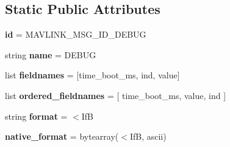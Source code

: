 \subsection*{Static Public Attributes}
\begin{DoxyCompactItemize}
\item 
\mbox{\label{classpymavlink_1_1dialects_1_1v10_1_1MAVLink__debug__message_a1e20d4c94801286ff8bda1676ebaf6cb}} 
{\bfseries id} = M\+A\+V\+L\+I\+N\+K\+\_\+\+M\+S\+G\+\_\+\+I\+D\+\_\+\+D\+E\+B\+UG
\item 
\mbox{\label{classpymavlink_1_1dialects_1_1v10_1_1MAVLink__debug__message_a5b3803ddad935b6e8ca979e3b39d24dd}} 
string {\bfseries name} = \textquotesingle{}D\+E\+B\+UG\textquotesingle{}
\item 
\mbox{\label{classpymavlink_1_1dialects_1_1v10_1_1MAVLink__debug__message_acf44ba440fdadf92e10a3fca32f04ab8}} 
list {\bfseries fieldnames} = \mbox{[}\textquotesingle{}time\+\_\+boot\+\_\+ms\textquotesingle{}, \textquotesingle{}ind\textquotesingle{}, \textquotesingle{}value\textquotesingle{}\mbox{]}
\item 
\mbox{\label{classpymavlink_1_1dialects_1_1v10_1_1MAVLink__debug__message_a47cc8a42c982e3cadd7e345e4ec17587}} 
list {\bfseries ordered\+\_\+fieldnames} = \mbox{[} \textquotesingle{}time\+\_\+boot\+\_\+ms\textquotesingle{}, \textquotesingle{}value\textquotesingle{}, \textquotesingle{}ind\textquotesingle{} \mbox{]}
\item 
\mbox{\label{classpymavlink_1_1dialects_1_1v10_1_1MAVLink__debug__message_a4773099204fbaf263d094ac1aef6093d}} 
string {\bfseries format} = \textquotesingle{}$<$IfB\textquotesingle{}
\item 
\mbox{\label{classpymavlink_1_1dialects_1_1v10_1_1MAVLink__debug__message_aa43d20f4b3a7c25098a1c0ce2f2112cd}} 
{\bfseries native\+\_\+format} = bytearray(\textquotesingle{}$<$IfB\textquotesingle{}, \textquotesingle{}ascii\textquotesingle{})

\end{DoxyCompactItemize}
